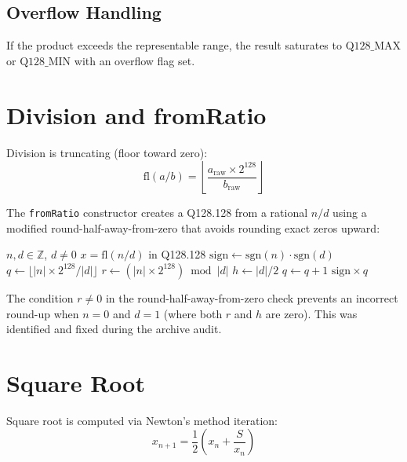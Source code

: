 \documentclass[11pt]{article}
\begin{document}
\subsection{Overflow Handling}

If the product exceeds the representable range, the result saturates to $\text{Q128\_MAX}$ or $\text{Q128\_MIN}$ with an overflow flag set.

\section{Division and fromRatio}

Division is truncating (floor toward zero):
\begin{equation}
\mathrm{fl}(a / b) = \left\lfloor \frac{a_{\text{raw}} \times 2^{128}}{b_{\text{raw}}} \right\rfloor
\end{equation}

The \texttt{fromRatio} constructor creates a Q128.128 from a rational $n/d$ using a modified round-half-away-from-zero that avoids rounding exact zeros upward:

\begin{algorithm}
\caption{fromRatio}\label{alg:fromratio}
\begin{algorithmic}[1]
\Require $n, d \in \mathbb{Z}$, $d \neq 0$
\Ensure $x = \mathrm{fl}(n/d)$ in Q128.128
\State $\text{sign} \gets \mathrm{sgn}(n) \cdot \mathrm{sgn}(d)$
\State $q \gets \lfloor |n| \times 2^{128} / |d| \rfloor$
\State $r \gets (|n| \times 2^{128}) \bmod |d|$
\State $h \gets |d| / 2$ 
    \State $q \gets q + 1$ 
\EndIf
\State \Return $\text{sign} \times q$
\end{algorithmic}
\end{algorithm}

\begin{remark}
The condition $r \neq 0$ in the round-half-away-from-zero check prevents an incorrect round-up when $n = 0$ and $d = 1$ (where both $r$ and $h$ are zero). This was identified and fixed during the archive audit.
\end{remark}

\section{Square Root}

Square root is computed via Newton's method iteration:
\begin{equation}
x_{n+1} = \frac{1}{2}\left(x_n + \frac{S}{x_n}\right)
\end{equation}
\end{document}
